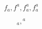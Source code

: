 \documentclass{article}
\begin{document}
$$ f_a,  f^a, f_a^a, f^a_a $$

$$ {}_a,  {}^a $$
\end{document}

